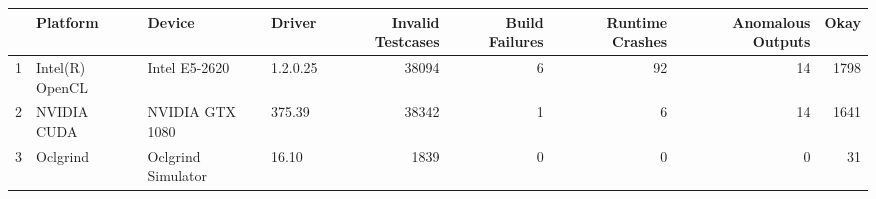 \begin{tabular}{llllrrrrr}
\toprule
{} &         Platform &              Device &    Driver &  Invalid Testcases &  Build Failures &  Runtime Crashes &  Anomalous  Outputs &  Okay \\
\midrule
1 &  Intel(R) OpenCL &       Intel E5-2620 &  1.2.0.25 &              38094 &               6 &               92 &                  14 &  1798 \\
2 &      NVIDIA CUDA &     NVIDIA GTX 1080 &    375.39 &              38342 &               1 &                6 &                  14 &  1641 \\
3 &         Oclgrind &  Oclgrind Simulator &     16.10 &               1839 &               0 &                0 &                   0 &    31 \\
\bottomrule
\end{tabular}
